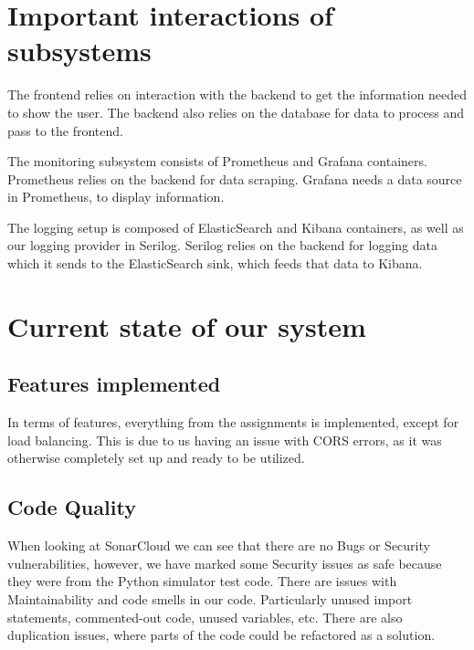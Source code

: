 \section{Important interactions of subsystems}

The frontend relies on interaction with the backend to get the information needed to show the user. The backend also relies on the database for data to process and pass to the frontend.\newline

\noindent The monitoring subsystem consists of Prometheus and Grafana containers. Prometheus relies on the backend for data scraping. Grafana needs a data source in Prometheus, to display information. \newline

\noindent The logging setup is composed of ElasticSearch and Kibana containers, as well as our logging provider in Serilog. Serilog relies on the backend for logging data which it sends to the ElasticSearch sink, which feeds that data to Kibana.



\section{Current state of our system}

\subsection{Features implemented}
In terms of features, everything from the assignments is implemented, except for load balancing. This is due to us having an issue with CORS errors, as it was otherwise completely set up and ready to be utilized.

\subsection{Code Quality}
When looking at SonarCloud we can see that there are no Bugs or Security vulnerabilities, however, we have marked some Security issues as safe because they were from the Python simulator test code. There are issues with Maintainability and code smells in our code. Particularly unused import statements, commented-out code, unused variables, etc. There are also duplication issues, where parts of the code could be refactored as a solution. \newline

